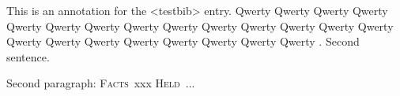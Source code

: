 This is an annotation for the <testbib> entry. Qwerty Qwerty Qwerty Qwerty Qwerty Qwerty Qwerty Qwerty Qwerty Qwerty Qwerty Qwerty Qwerty Qwerty Qwerty Qwerty Qwerty Qwerty Qwerty Qwerty Qwerty Qwerty .
Second sentence.\par
Second paragraph: \textsc{Facts}\ xxx \textsc{Held}\ ...
\endinput